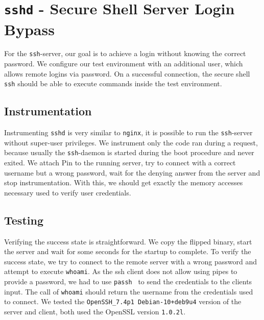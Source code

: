 \section{\texttt{sshd} - Secure Shell Server Login Bypass}

For the \texttt{ssh}-server, our goal is to achieve a login without knowing the
correct password. We configure our test environment with an additional user,
which allows remote logins via password. On a successful connection, the secure
shell \texttt{ssh} should be able to execute commands inside the test
environment.

\subsection{Instrumentation}

Instrumenting \texttt{sshd} is very similar to \texttt{nginx}, it is possible to
run the \texttt{ssh}-server without super-user privileges. We instrument only
the code ran during a request, because usually the \texttt{ssh}-daemon is
started during the boot procedure and never exited. We attach Pin to the running
server, try to connect with a correct username but a wrong password, wait for
the denying answer from the server and stop instrumentation.  With this, we
should get exactly the memory accesses necessary used to verify user
credentials.

\subsection{Testing}

Verifying the success state is straightforward. We copy the flipped binary,
start the server and wait for some seconds for the startup to complete. To
verify the success state, we try to connect to the remote server with a wrong
password and attempt to execute \texttt{whoami}. As the ssh client does not
allow using pipes to provide a password, we had to use
\texttt{passh}~\cite{passhweb} to send the credentials to the
client\textquotesingle s input. The call of \texttt{whoami} should return the
username from the credentials used to connect. We tested the
\texttt{OpenSSH\_7.4p1 Debian-10+deb9u4} version of the server and client, both
used the OpenSSL version \texttt{1.0.2l}.

